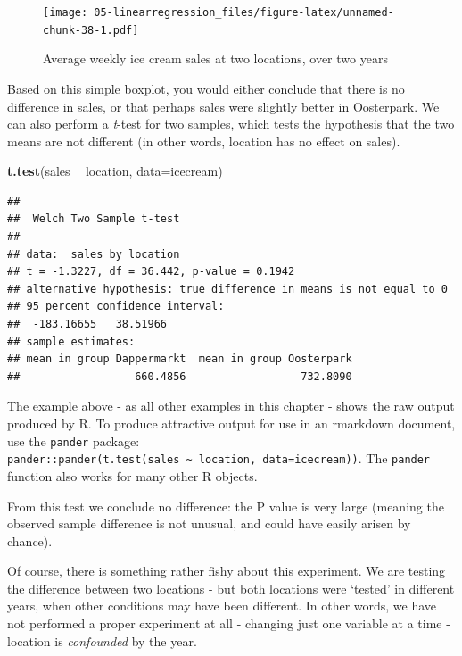 \documentclass[]{book}
\newenvironment{Shaded}{\begin{snugshade}}{\end{snugshade}}
\newcommand{\DataTypeTok}[1]{\textcolor[rgb]{0.13,0.29,0.53}{#1}}
\newcommand{\KeywordTok}[1]{\textcolor[rgb]{0.13,0.29,0.53}{\textbf{#1}}}
\newcommand{\NormalTok}[1]{#1}
\newcommand{\OperatorTok}[1]{\textcolor[rgb]{0.81,0.36,0.00}{\textbf{#1}}}
\newcommand{\StringTok}[1]{\textcolor[rgb]{0.31,0.60,0.02}{#1}}
\let\BeginKnitrBlock\begin \let\EndKnitrBlock\end
\begin{document}
\begin{figure}
\centering
\texttt{[image: 05-linearregression\_files/figure-latex/unnamed-chunk-38-1.pdf]}
\caption{\label{fig:unnamed-chunk-38}Average weekly ice cream sales at two locations, over two years}
\end{figure}

Based on this simple boxplot, you would either conclude that there is no difference in sales, or that perhaps sales were slightly better in Oosterpark. We can also perform a \emph{t}-test for two samples, which tests the hypothesis that the two means are not different (in other words, location has no effect on sales).

\begin{Shaded}
\begin{Highlighting}[]
\KeywordTok{t.test}\NormalTok{(sales }\OperatorTok{~}\StringTok{ }\NormalTok{location, }\DataTypeTok{data=}\NormalTok{icecream)}
\end{Highlighting}
\end{Shaded}

\begin{verbatim}
## 
##  Welch Two Sample t-test
## 
## data:  sales by location
## t = -1.3227, df = 36.442, p-value = 0.1942
## alternative hypothesis: true difference in means is not equal to 0
## 95 percent confidence interval:
##  -183.16655   38.51966
## sample estimates:
## mean in group Dappermarkt  mean in group Oosterpark 
##                  660.4856                  732.8090
\end{verbatim}

\BeginKnitrBlock{rmdnote}
The example above - as all other examples in this chapter - shows the raw output produced by R. To produce attractive output for use in an rmarkdown document, use the \texttt{pander} package: \texttt{pander::pander(t.test(sales\ \textasciitilde{}\ location,\ data=icecream))}. The \texttt{pander} function also works for many other R objects.
\EndKnitrBlock{rmdnote}

From this test we conclude no difference: the P value is very large (meaning the observed sample difference is not unusual, and could have easily arisen by chance).

Of course, there is something rather fishy about this experiment. We are testing the difference between two locations - but both locations were `tested' in different years, when other conditions may have been different. In other words, we have not performed a proper experiment at all - changing just one variable at a time - location is \emph{confounded} by the year.
\end{document}
